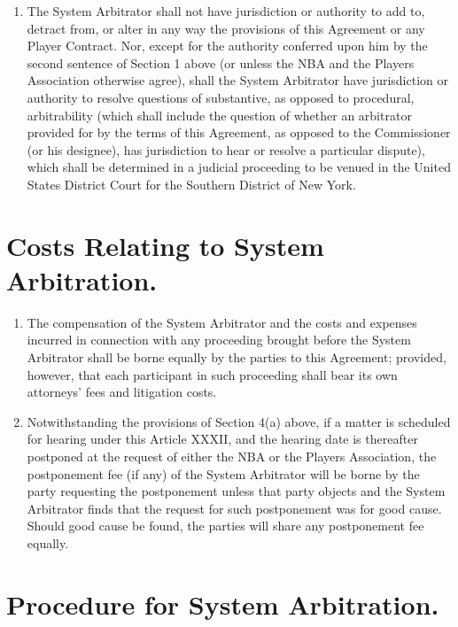 \documentclass[
]{book}
\providecommand{\tightlist}{%
  \setlength{\itemsep}{0pt}\setlength{\parskip}{0pt}}
\begin{document}
\begin{enumerate}
\item
  The System Arbitrator shall not have jurisdiction or authority to add to, detract from, or alter in any way the provisions of this Agreement or any Player Contract. Nor, except for the authority conferred upon him by the second sentence of Section 1 above (or unless the NBA and the Players Association otherwise agree), shall the System Arbitrator have jurisdiction or authority to resolve questions of substantive, as opposed to procedural, arbitrability (which shall include the question of whether an arbitrator provided for by the terms of this Agreement, as opposed to the Commissioner (or his designee), has jurisdiction to hear or resolve a particular dispute), which shall be determined in a judicial proceeding to be venued in the United States District Court for the Southern District of New York.
\end{enumerate}

\hypertarget{costs-relating-to-system-arbitration.}{%
\section{Costs Relating to System Arbitration.}\label{costs-relating-to-system-arbitration.}}

\begin{enumerate}
\def\labelenumi{(\alph{enumi})}
\tightlist
\item
  The compensation of the System Arbitrator and the costs and expenses incurred in connection with any proceeding brought before the System Arbitrator shall be borne equally by the parties to this Agreement; provided, however, that each participant in such proceeding shall bear its own attorneys' fees and litigation costs.
\item
  Notwithstanding the provisions of Section 4(a) above, if a matter is scheduled for hearing under this Article XXXII, and the hearing date is thereafter postponed at the request of either the NBA or the Players Association, the postponement fee (if any) of the System Arbitrator will be borne by the party requesting the postponement unless that party objects and the System Arbitrator finds that the request for such postponement was for good cause. Should good cause be found, the parties will share any postponement fee equally.
\end{enumerate}

\hypertarget{procedure-for-system-arbitration.}{%
\section{Procedure for System Arbitration.}\label{procedure-for-system-arbitration.}}
\end{document}
